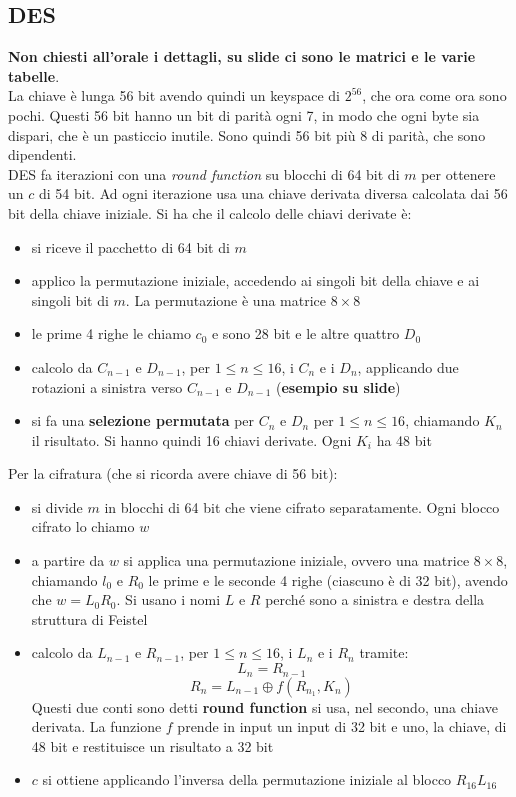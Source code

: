 \documentclass[a4paper,12pt, oneside]{book}
\begin{document}
\subsection{DES}
\textbf{Non chiesti all'orale i dettagli, su slide ci sono le matrici e le
  varie tabelle}.\\
La chiave è lunga 56 bit avendo quindi un keyspace di $2^{56}$, che ora come ora
sono pochi. Questi 56 bit hanno un bit di parità ogni 7, in modo che ogni byte
sia dispari, che è un pasticcio inutile. Sono quindi 56 bit più 8 di parità, che
sono dipendenti.\\
DES fa iterazioni con una \textit{round function} su blocchi di 64 bit di $m$
per ottenere un $c$ di 54 bit. Ad ogni iterazione usa una chiave derivata
diversa calcolata dai 56 bit della chiave iniziale. Si ha che il calcolo delle
chiavi derivate è:
\begin{itemize}
  \item si riceve il pacchetto di 64 bit di $m$
  \item applico la permutazione iniziale, accedendo ai singoli bit della chiave
  e ai singoli bit di $m$. La permutazione è una matrice $8\times 8$
  \item le prime 4 righe le chiamo $c_0$ e sono 28 bit e le altre quattro $D_0$
  \item calcolo da $C_{n-1}$ e $D_{n-1}$, per $1\leq n\leq 16$, i $C_n$ e i
  $D_n$, applicando due rotazioni a sinistra verso $C_{n-1}$ e $D_{n-1}$
  (\textbf{esempio su slide})
  \item si fa una \textbf{selezione permutata} per $C_n$ e $D_n$ per $1\leq
  n\leq 16$, chiamando $K_n$ il risultato. Si hanno quindi 16 chiavi
  derivate. Ogni $K_i$ ha 48 bit
\end{itemize}
Per la cifratura (che si ricorda avere chiave di 56 bit):
\begin{itemize}
  \item si divide $m$ in blocchi di 64 bit che viene cifrato separatamente. Ogni
  blocco cifrato lo chiamo $w$
  \item a partire da $w$ si applica una permutazione iniziale, ovvero una
  matrice $8\times 8$, chiamando $l_0$ e
  $R_0$ le prime e le seconde 4 righe (ciascuno è di 32 bit), avendo che
  $w=L_0R_0$. Si usano i nomi $L$ e $R$ perché sono a sinistra e destra della
  struttura di Feistel
  \item calcolo da $L_{n-1}$ e $R_{n-1}$, per $1\leq n\leq 16$, i $L_n$ e i
  $R_n$ tramite:
  \[L_n=R_{n-1}\]
  \[R_n=L_{n-1}\oplus f(R_{n_1},K_n)\]
  Questi due conti sono detti \textbf{round function} si usa, nel secondo, una
  chiave derivata. La funzione $f$ prende in input un input di 32 bit e uno, la
  chiave, di 48 bit e restituisce un risultato a 32 bit
  \item $c$ si ottiene applicando l'inversa della permutazione iniziale al
  blocco $R_{16}L_{16}$ 
\end{itemize}
\end{document}
